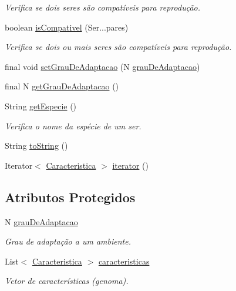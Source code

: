 \begin{DoxyCompactItemize}
\begin{DoxyCompactList}\small\item\em Verifica se dois seres são compatíveis para reprodução. \end{DoxyCompactList}\item 
boolean \hyperlink{classic_1_1populacional_1_1_ser_3_01_n_01extends_01_number_01_4_a1859882d10ecc4a0d429449bbb082640}{is\-Compativel} (Ser...\-pares)
\begin{DoxyCompactList}\small\item\em Verifica se dois ou mais seres são compatíveis para reprodução. \end{DoxyCompactList}\item 
final void \hyperlink{classic_1_1populacional_1_1_ser_3_01_n_01extends_01_number_01_4_a5302117d5910951dafb3d7f893acdac5}{set\-Grau\-De\-Adaptacao} (N \hyperlink{classic_1_1populacional_1_1_ser_3_01_n_01extends_01_number_01_4_a9f4bec4ec52f681cc2fe57e04bdb6c4e}{grau\-De\-Adaptacao})
\item 
final N \hyperlink{classic_1_1populacional_1_1_ser_3_01_n_01extends_01_number_01_4_aaa51833947ef41ce98587d8d4755db91}{get\-Grau\-De\-Adaptacao} ()
\item 
String \hyperlink{classic_1_1populacional_1_1_ser_3_01_n_01extends_01_number_01_4_a3e49c0baeecfc306a4558a0a68830bd5}{get\-Especie} ()
\begin{DoxyCompactList}\small\item\em Verifica o nome da espécie de um ser. \end{DoxyCompactList}\item 
String \hyperlink{classic_1_1populacional_1_1_ser_3_01_n_01extends_01_number_01_4_a4a9f435354f52d97737135a752dd6b20}{to\-String} ()
\item 
Iterator$<$ \hyperlink{classic_1_1populacional_1_1_caracteristica}{Caracteristica} $>$ \hyperlink{classic_1_1populacional_1_1_ser_3_01_n_01extends_01_number_01_4_a705b5c26ede7072db1bae7abb65dc576}{iterator} ()
\end{DoxyCompactItemize}
\subsection*{Atributos Protegidos}
\begin{DoxyCompactItemize}
\item 
N \hyperlink{classic_1_1populacional_1_1_ser_3_01_n_01extends_01_number_01_4_a9f4bec4ec52f681cc2fe57e04bdb6c4e}{grau\-De\-Adaptacao}
\begin{DoxyCompactList}\small\item\em Grau de adaptação a um ambiente. \end{DoxyCompactList}\item 
List$<$ \hyperlink{classic_1_1populacional_1_1_caracteristica}{Caracteristica} $>$ \hyperlink{classic_1_1populacional_1_1_ser_3_01_n_01extends_01_number_01_4_a2006e8efb9bf95aa5e6b04a294c4f171}{caracteristicas}
\begin{DoxyCompactList}\small\item\em Vetor de {\ttfamily características} (genoma). \end{DoxyCompactList}\end{DoxyCompactItemize}


